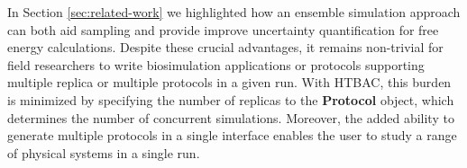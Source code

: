 	In Section \ref{sec:related-work} we highlighted how an ensemble simulation 
approach can both aid sampling and provide improve uncertainty quantification 
for free energy calculations. Despite these crucial advantages, 
it remains non-trivial for field 
researchers to write biosimulation applications or protocols supporting 
multiple replica or multiple protocols in a given run. With HTBAC, this 
burden is minimized by specifying the number of replicas to the 
\textbf{Protocol} object, which determines the number of concurrent simulations. 
Moreover, the added ability to generate multiple protocols in a single interface 
enables the user to study a range of physical systems in a single run. 









